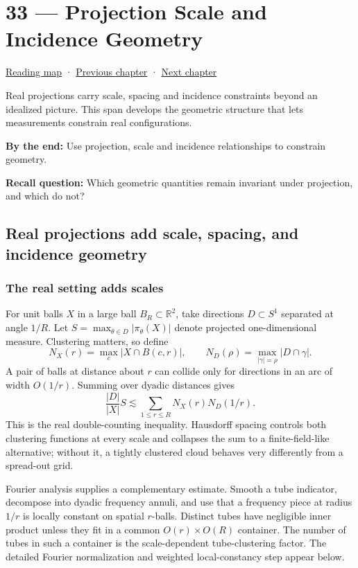 \hypertarget{04-visual-computing-ii-ch033}{}
\chapter{33 --- Projection Scale and Incidence Geometry}\label{04-visual-computing-ii-ch033-projection-scale-and-incidence-geometry}

\hyperref[volume-reading-map]{Reading map} · \hyperref[04-visual-computing-ii-ch032]{Previous chapter} · \hyperref[04-visual-computing-ii-ch034]{Next chapter}

Real projections carry scale, spacing and incidence constraints beyond an idealized picture. This span develops the geometric structure that lets measurements constrain real configurations.

\textbf{By the end:} Use projection, scale and incidence relationships to constrain geometry.

\textbf{Recall question:} Which geometric quantities remain invariant under projection, and which do not?

\section{Real projections add scale, spacing, and incidence geometry}\label{04-visual-computing-ii-ch033-real-projections-add-scale-spacing-and-incidence-geometry}

\subsection{The real setting adds scales}\label{04-visual-computing-ii-ch033-the-real-setting-adds-scales}

For unit balls \(X\) in a large ball \(B_R\subset\mathbb R^2\), take directions \(D\subset S^1\) separated at angle \(1/R\). Let \(S=\max_{\theta\in D}|\pi_\theta(X)|\) denote projected one-dimensional measure. Clustering matters, so define \[N_X(r)=\max_c|X\cap B(c,r)|,\qquad
N_D(\rho)=\max_{|\gamma|=\rho}|D\cap\gamma|.\] A pair of balls at distance about \(r\) can collide only for directions in an arc of width \(O(1/r)\). Summing over dyadic distances gives \[\frac{|D|}{|X|}S\lesssim\sum_{1\le r\le R}N_X(r)N_D(1/r).\] This is the real double-counting inequality. Hausdorff spacing controls both clustering functions at every scale and collapses the sum to a finite-field-like alternative; without it, a tightly clustered cloud behaves very differently from a spread-out grid.

Fourier analysis supplies a complementary estimate. Smooth a tube indicator, decompose into dyadic frequency annuli, and use that a frequency piece at radius \(1/r\) is locally constant on spatial \(r\)-balls. Distinct tubes have negligible inner product unless they fit in a common \(O(r)\times O(R)\) container. The number of tubes in such a container is the scale-dependent tube-clustering factor. The detailed Fourier normalization and weighted local-constancy step appear below.

